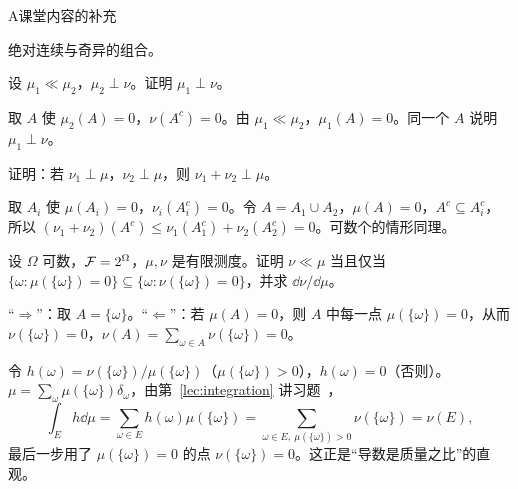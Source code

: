 \begin{exercises}{A}{课堂内容的补充}
\item\label{ex:ac:A4} 绝对连续与奇异的组合。
\begin{questions}
\item 设 $\mu_1\ll\mu_2$，$\mu_2\perp\nu$。证明 $\mu_1\perp\nu$。
\begin{solution}
取 $A$ 使 $\mu_2(A)=0$，$\nu(A^c)=0$。由 $\mu_1\ll\mu_2$，$\mu_1(A)=0$。同一个 $A$ 说明 $\mu_1\perp\nu$。
\end{solution}
\item 证明：若 $\nu_1\perp\mu$，$\nu_2\perp\mu$，则 $\nu_1+\nu_2\perp\mu$。
\begin{solution}
取 $A_i$ 使 $\mu(A_i)=0$，$\nu_i(A_i^c)=0$。令 $A=A_1\cup A_2$，$\mu(A)=0$，$A^c\subseteq A_i^c$，所以 $(\nu_1+\nu_2)(A^c)\leqslant\nu_1(A_1^c)+\nu_2(A_2^c)=0$。可数个的情形同理。
\end{solution}
\end{questions}

\item\label{ex:ac:A5} 设 $\Omega$ 可数，$\mathcal{F}=2^\Omega$，$\mu,\nu$ 是有限测度。证明 $\nu\ll\mu$ 当且仅当 $\{\omega:\mu(\{\omega\})=0\}\subseteq\{\omega:\nu(\{\omega\})=0\}$，并求 $\dd\nu/\dd\mu$。
\begin{solution}
“$\Rightarrow$”：取 $A=\{\omega\}$。“$\Leftarrow$”：若 $\mu(A)=0$，则 $A$ 中每一点 $\mu(\{\omega\})=0$，从而 $\nu(\{\omega\})=0$，$\nu(A)=\sum_{\omega\in A}\nu(\{\omega\})=0$。

令 $h(\omega)=\nu(\{\omega\})/\mu(\{\omega\})$（$\mu(\{\omega\})>0$），$h(\omega)=0$（否则）。$\mu=\sum_\omega\mu(\{\omega\})\delta_\omega$，由第~\ref{lec:integration} 讲习题~，
\[
\int_Eh\dd\mu=\sum_{\omega\in E}h(\omega)\mu(\{\omega\})=\sum_{\omega\in E,\ \mu(\{\omega\})>0}\nu(\{\omega\})=\nu(E),
\]
最后一步用了 $\mu(\{\omega\})=0$ 的点 $\nu(\{\omega\})=0$。这正是“导数是质量之比”的直观。
\end{solution}


\end{exercises}
